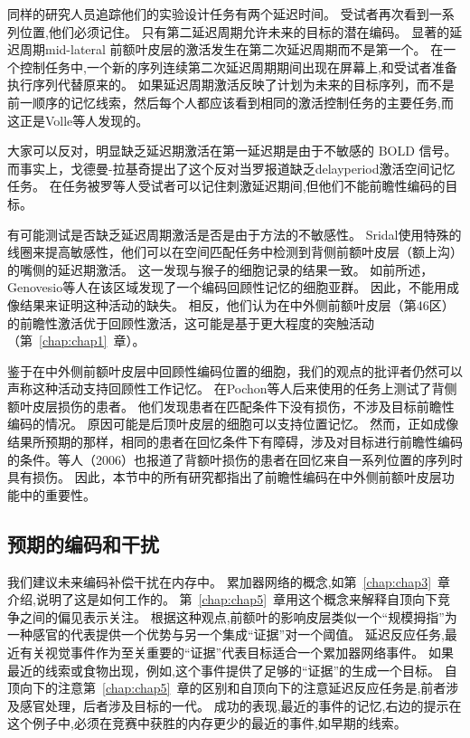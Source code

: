 同样的研究人员追踪他们的实验设计任务有两个延迟时间\cite{volle2005specific}。
受试者再次看到一系列位置,他们必须记住。
只有第二延迟周期允许未来的目标的潜在编码。
显著的延迟周期mid-lateral 前额叶皮层的激活发生在第二次延迟周期而不是第一个。
在一个控制任务中,一个新的序列连续第二次延迟周期期间出现在屏幕上,和受试者准备执行序列代替原来的。
如果延迟周期激活反映了计划为未来的目标序列，而不是前一顺序的记忆线索，然后每个人都应该看到相同的激活控制任务的主要任务,而这正是Volle等人发现的。


大家可以反对，明显缺乏延迟期激活在第一延迟期是由于不敏感的 BOLD 信号。
而事实上，戈德曼-拉基奇\cite{goldman2002functional}提出了这个反对当罗\cite{rowe2000prefrontal}报道缺乏delayperiod激活空间记忆任务。
在任务被罗等人受试者可以记住刺激延迟期间,但他们不能前瞻性编码的目标。


有可能测试是否缺乏延迟周期激活是否是由于方法的不敏感性。
Sridal\cite{srimal2008persistent}使用特殊的线圈来提高敏感性，他们可以在空间匹配任务中检测到背侧前额叶皮层（额上沟）的嘴侧的延迟期激活。
这一发现与猴子的细胞记录的结果一致。
如前所述，Genovesio等人\cite{genovesio2006representation}在该区域发现了一个编码回顾性记忆的细胞亚群。
因此，不能用成像结果来证明这种活动的缺失。
相反，他们认为在中外侧前额叶皮层（第46区）的前瞻性激活优于回顾性激活，这可能是基于更大程度的突触活动（第~\ref{chap:chap1}~章）。



鉴于在中外侧前额叶皮层中回顾性编码位置的细胞，我们的观点的批评者仍然可以声称这种活动支持回顾性工作记忆。
在Pochon等人后来使用的任务上测试了背侧额叶皮层损伤的患者。
他们发现患者在匹配条件下没有损伤，不涉及目标前瞻性编码的情况。
原因可能是后顶叶皮层的细胞可以支持位置记忆。
然而，正如成像结果所预期的那样，相同的患者在回忆条件下有障碍，涉及对目标进行前瞻性编码的条件\cite{ferreira1998spatio}。等人（2006）也报道了背额叶损伤的患者在回忆来自一系列位置的序列时具有损伤。
因此，本节中的所有研究都指出了前瞻性编码在中外侧前额叶皮层功能中的重要性。



\subsection{预期的编码和干扰}

我们建议未来编码补偿干扰在内存中。
累加器网络的概念,如第~\ref{chap:chap3}~章介绍,说明了这是如何工作的。
第~\ref{chap:chap5}~章用这个概念来解释自顶向下竞争之间的偏见表示关注。
根据这种观点,前额叶的影响皮层类似一个“规模拇指”为一种感官的代表提供一个优势与另一个集成“证据”对一个阈值。
延迟反应任务,最近有关视觉事件作为至关重要的“证据”代表目标适合一个累加器网络事件。
如果最近的线索或食物出现，例如,这个事件提供了足够的“证据”的生成一个目标。
自顶向下的注意第~\ref{chap:chap5}~章的区别和自顶向下的注意延迟反应任务是,前者涉及感官处理，后者涉及目标的一代。
成功的表现,最近的事件的记忆,右边的提示在这个例子中,必须在竞赛中获胜的内存更少的最近的事件,如早期的线索。


